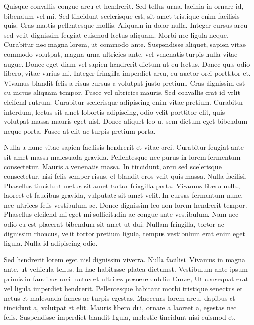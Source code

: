 \documentclass{EPUProjetDi}
\begin{document}
Quisque convallis congue arcu et hendrerit. Sed tellus urna, lacinia in ornare id, bibendum vel mi. Sed tincidunt scelerisque est, sit amet tristique enim facilisis quis. Cras mattis pellentesque mollis. Aliquam in dolor nulla. Integer cursus arcu sed velit dignissim feugiat euismod lectus aliquam. Morbi nec ligula neque. Curabitur nec magna lorem, ut commodo ante. Suspendisse aliquet, sapien vitae commodo volutpat, magna urna ultricies ante, vel venenatis turpis nulla vitae augue. Donec eget diam vel sapien hendrerit dictum ut eu lectus. Donec quis odio libero, vitae varius mi. Integer fringilla imperdiet arcu, eu auctor orci porttitor et. Vivamus blandit felis a risus cursus a volutpat justo pretium. Cras dignissim est eu metus aliquam tempor. Fusce vel ultricies mauris. Sed convallis erat id velit eleifend rutrum. Curabitur scelerisque adipiscing enim vitae pretium. Curabitur interdum, lectus sit amet lobortis adipiscing, odio velit porttitor elit, quis volutpat massa mauris eget nisl. Donec aliquet leo ut sem dictum eget bibendum neque porta. Fusce at elit ac turpis pretium porta.

Nulla a nunc vitae sapien facilisis hendrerit et vitae orci. Curabitur feugiat ante sit amet massa malesuada gravida. Pellentesque nec purus in lorem fermentum consectetur. Mauris a venenatis massa. In tincidunt, arcu sed scelerisque consectetur, nisi felis semper risus, et blandit eros velit quis massa. Nulla facilisi. Phasellus tincidunt metus sit amet tortor fringilla porta. Vivamus libero nulla, laoreet et faucibus gravida, vulputate sit amet velit. In cursus fermentum nunc, nec ultrices felis vestibulum ac. Donec dignissim leo non lorem hendrerit tempor. Phasellus eleifend mi eget mi sollicitudin ac congue ante vestibulum. Nam nec odio eu est placerat bibendum sit amet ut dui. Nullam fringilla, tortor ac dignissim rhoncus, velit tortor pretium ligula, tempus vestibulum erat enim eget ligula. Nulla id adipiscing odio.

Sed hendrerit lorem eget nisl dignissim viverra. Nulla facilisi. Vivamus in magna ante, ut vehicula tellus. In hac habitasse platea dictumst. Vestibulum ante ipsum primis in faucibus orci luctus et ultrices posuere cubilia Curae; Ut consequat erat vel ligula imperdiet hendrerit. Pellentesque habitant morbi tristique senectus et netus et malesuada fames ac turpis egestas. Maecenas lorem arcu, dapibus et tincidunt a, volutpat et elit. Mauris libero dui, ornare a laoreet a, egestas nec felis. Suspendisse imperdiet blandit ligula, molestie tincidunt nisi euismod et.
\end{document}
